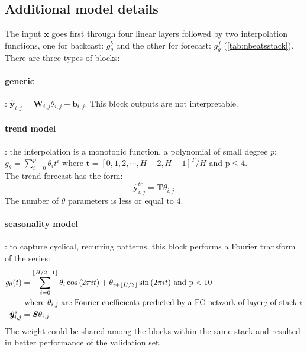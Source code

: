 \documentclass{article}
\DeclarePairedDelimiter\floor{\lfloor}{\rfloor}
\newcommand{\vect}[1]{\bm{#1}} %
\newcommand{\matr}[1]{\bm{#1}} %
\begin{document}
\subsection{Additional model details}
The input $\vect{x}$ goes first through four linear layers followed by two interpolation functions, one for backcast: $g_\theta^b$ and the other for forecast: $g_\theta^f$  (\autoref{tab:nbeatsstack}).
There are three types of blocks:
\paragraph{generic}: $\hat{\vect{y}}_{i,j} = \matr{W}_{i,j} \theta_{i,j} + \vect{b}_{i,j}$. This block outputs are not interpretable.
\paragraph{trend model}: the interpolation is a monotonic function, a polynomial of small degree $p$: \\
$g_\theta = \sum_{i=0}^p \theta_i t^i$ where $\vect{t} = [0,1,2,\cdots,H-2, H-1]^T/H \text{ and p} \le 4$. \\
The trend forecast has the form: 
\[
	\hat{\vect{y}}_{i,j}^{tr} = \matr{T} \theta_{i,j}
\]
The number of  $\theta$ parameters is less or equal to 4.
\paragraph{seasonality model}: to capture cyclical, recurring patterns, this block performs a Fourier transform of the series: 
\begin{align*}
		g_\theta (t)		&= \sum_{i=0}^{\floor*{H/2-1}} \theta_i \cos{(2 \pi it)} + \theta_{i + \floor*{H/2}}  \sin{(2 \pi it)}  \text{ and p} < 10\\
						&	\text{ where } \theta_{i,j} \text{ are Fourier coefficients predicted by a FC network of layer} j \text{ of stack } i \\
		\hat{\vect{y}}_{i,j}^{s} &= \matr{S} \theta_{i,j}		
\end{align*}
The weight could be shared among the blocks within the same stack and resulted in better performance of the validation set.
\end{document}
